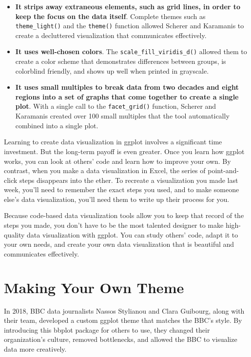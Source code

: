 \documentclass[
]{book}
\begin{document}
\begin{itemize}
\item
  \textbf{It strips away extraneous elements, such as grid lines, in order to keep the focus on the data itself}. Complete themes such as \texttt{theme\_light()} and the \texttt{theme()} function allowed Scherer and Karamanis to create a decluttered visualization that communicates effectively.
\item
  \textbf{It uses well-chosen colors}. The \texttt{scale\_fill\_viridis\_d()} allowed them to create a color scheme that demonstrates differences between groups, is colorblind friendly, and shows up well when printed in grayscale.
\item
  \textbf{It uses small multiples to break data from two decades and eight regions into a set of graphs that come together to create a single plot}. With a single call to the \texttt{facet\_grid()} function, Scherer and Karamanis created over 100 small multiples that the tool automatically combined into a single plot.
\end{itemize}

Learning to create data visualization in ggplot involves a significant time investment. But the long-term payoff is even greater. Once you learn how ggplot works, you can look at others' code and learn how to improve your own. By contrast, when you make a data visualization in Excel, the series of point-and-click steps disappears into the ether. To recreate a visualization you made last week, you'll need to remember the exact steps you used, and to make someone else's data visualization, you'll need them to write up their process for you.

Because code-based data visualization tools allow you to keep that record of the steps you made, you don't have to be the most talented designer to make high-quality data visualization with ggplot. You can study others' code, adapt it to your own needs, and create your own data visualization that is beautiful and communicates effectively.

\hypertarget{custom-theme-chapter}{%
\chapter{Making Your Own Theme}\label{custom-theme-chapter}}

In 2018, BBC data journalists Nassos Stylianou and Clara Guibourg, along with their team, developed a custom ggplot theme that matches the BBC's style. By introducing this bbplot package for others to use, they changed their organization's culture, removed bottlenecks, and allowed the BBC to visualize data more creatively.
\end{document}
